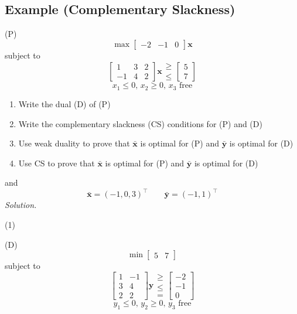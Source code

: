 \subsection{Example (Complementary Slackness)}
(P)
\[ \max
\begin{bmatrix}
    -2 & -1 & 0
\end{bmatrix}\bm{x} \]
subject to
\[
\begin{bmatrix}
    1 & 3 & 2\\
    -1 & 4 & 2
\end{bmatrix}\bm{x}
\begin{matrix}
    \ge\\
    \le
\end{matrix}
\begin{bmatrix}
    5\\
    7
\end{bmatrix}\]
\[ x_1\le 0,\,x_2\ge 0,\,x_3\text{ free} \]
\begin{enumerate}[(1)]
    \item Write the dual (D) of (P)
    \item Write the complementary slackness (CS) conditions for (P) and (D)
    \item Use weak duality to prove that $ \bm{\bar{x}} $ is optimal for (P)
    and $ \bm{\bar{y}} $ is optimal for (D)
    \item Use CS to prove that $ \bm{\bar{x}} $ is optimal for (P) and
    $ \bm{\bar{y}} $ is optimal for (D)
\end{enumerate}
and
\[ \bm{\bar{x}}=(-1,0,3)^\top\qquad \bm{\bar{y}}=(-1,1)^\top \]
\emph{Solution.}

(1)

(D)
\[ \min
\begin{bmatrix}
    5 & 7
\end{bmatrix} \]
subject to
\[
\begin{bmatrix}
    1 & -1\\
    3 & 4\\
    2 & 2
\end{bmatrix}\bm{y}
\begin{matrix}
    \ge\\
    \le\\
    =
\end{matrix}
\begin{bmatrix}
    -2\\
    -1\\
    0
\end{bmatrix}\]
\[ y_1\le 0,\,y_2\ge 0,\,y_3\text{ free} \]

